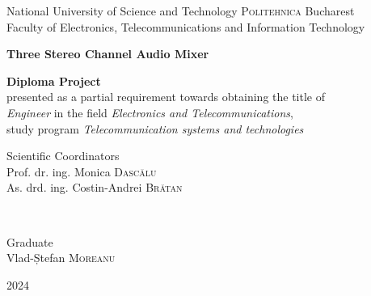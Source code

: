 






\raggedbottom
{}
\pagestyle{empty}

\begin{titlepage}
    \center
    {\large National University of Science and Technology
    \textsc{Politehnica} Bucharest\\
    Faculty of Electronics, Telecommunications and Information Technology
    }

    \vfill\vfill

    {\LARGE \bf Three Stereo Channel Audio Mixer}

    \vfill\vfill
    {
        {\HUGE \bf Diploma Project}\\
        {\Large
        presented as a partial requirement towards obtaining
        the title of\\
        {\it Engineer} in the field
        {\it Electronics and Telecommunications},\\
        study program
        {\it Telecommunication systems and technologies}
        }
    }

    \vfill\vfill

    \begin{minipage}[t]{0.49\textwidth}
        \flushleft \large
        Scientific Coordinators\\
        Prof. dr. ing. Monica \textsc{Dascălu}\\
        As. drd. ing. Costin-Andrei \textsc{Brătan}
    \end{minipage}
    ~
    \begin{minipage}[t]{0.49\textwidth}
        \flushright \large
        Graduate\\
        Vlad-Ștefan \textsc{Moreanu}
    \end{minipage}

    \vfill\vfill\vfill

    {\Large 2024}
\end{titlepage}

